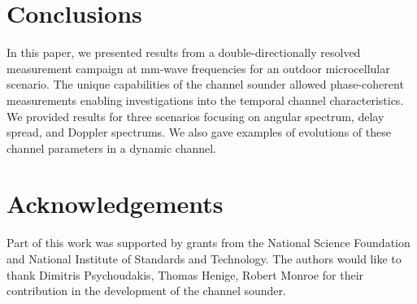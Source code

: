 \documentclass[conference]{IEEEtran}
\begin{document}
\section{Conclusions}\label{sec_conc}

In this paper, we presented results from a double-directionally resolved measurement campaign at mm-wave frequencies for an outdoor microcellular scenario. The unique capabilities of the channel sounder allowed phase-coherent measurements enabling investigations into the temporal channel characteristics. We provided results for three scenarios focusing on angular spectrum, delay spread, and Doppler spectrums. We also gave examples of evolutions of these channel parameters in a dynamic channel. 

\section*{Acknowledgements}
Part of this work was supported by grants from the National Science Foundation and National Institute of Standards and Technology. The authors would like to thank Dimitris Psychoudakis, Thomas Henige, Robert Monroe for their contribution in the development of the channel sounder.



\end{document}
